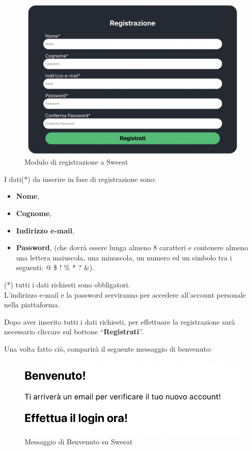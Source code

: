 \begin{figure}[H]
\centering
\includegraphics[scale=0.3]{./images/Registrazione/FormRegistrazione.png} 
\caption{Modulo di registrazione a Sweeat}
\end{figure}

I dati(*) da inserire in fase di registrazione sono:

\begin{itemize}
\item \textbf{Nome},
\item \textbf{Cognome},
\item \textbf{Indirizzo e-mail}, 
\item \textbf{Password}, (che dovrà essere lunga almeno 8 caratteri e contenere almeno una lettera maiuscola, una minuscola, un numero ed un simbolo tra i seguenti: @ \$ ! \% * ? \&). 
\end{itemize}

(*) tutti i dati richiesti sono obbligatori. \\

L’indirizzo e-mail e la password serviranno per accedere all'account personale nella piattaforma.

Dopo aver inserito tutti i dati richiesti, per effettuare la registrazione sarà necessario cliccare sul bottone “\textbf{Registrati}”.

Una volta fatto ciò, comparirà il seguente messaggio di benvenuto: 

\begin{figure}[H]
\centering
\includegraphics[scale=0.5]{./images/Registrazione/Welcome.png} 
\caption{Messaggio di Benvenuto su Sweeat}
\end{figure}

